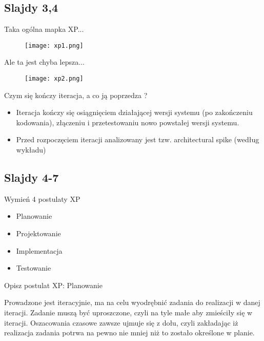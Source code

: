 \documentclass[a4paper,15pt]{article}
\begin{document}
\subsection{Slajdy 3,4}
Taka ogólna mapka XP...

\begin{figure}[H]
\centerline{\texttt{[image: xp1.png]}}
\end{figure}

\newpage
Ale ta jest chyba lepsza...
\begin{figure}[H]
\centerline{\texttt{[image: xp2.png]}}
\end{figure}

\begin{framed}
Czym się kończy iteracja, a co ją poprzedza ?
\end{framed}
\begin{itemize}
\item Iteracja kończy się osiągnięciem działającej wersji systemu (po zakończeniu kodowania), złączeniu i przetestowaniu nowo powstałej wersji systemu. 
\item Przed rozpoczęciem iteracji analizowany jest tzw. architectural spike (według wykładu)
\end{itemize}


\subsection{Slajdy 4-7}
\begin{framed}
Wymień 4 postulaty XP
\end{framed}
\begin{itemize}
\item Planowanie
\item Projektowanie
\item Implementacja
\item Testowanie
\end{itemize}

\begin{framed}
Opisz postulat XP: Planowanie
\end{framed}
Prowadzone jest iteracyjnie, ma na celu wyodrębnić zadania do realizacji w danej iteracji. Zadanie muszą być uproszczone, czyli na tyle małe aby zmieściły się w iteracji. Oszacowania  czasowe  zawsze  ujmuje  się  z dołu,  czyli zakładając iż realizacja zadania potrwa na pewno nie mniej niż  to zostało określone w planie. 
\end{document}
